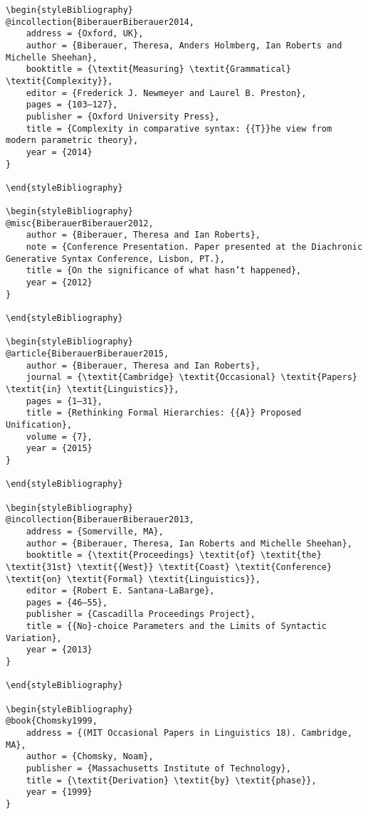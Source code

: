 \documentclass[output=paper,modfonts,nonflat]{langsci/langscibook}
\begin{document}
\begin{verbatim}
\begin{styleBibliography}
@incollection{BiberauerBiberauer2014,
	address = {Oxford, UK},
	author = {Biberauer, Theresa, Anders Holmberg, Ian Roberts and Michelle Sheehan},
	booktitle = {\textit{Measuring} \textit{Grammatical} \textit{Complexity}},
	editor = {Frederick J. Newmeyer and Laurel B. Preston},
	pages = {103–127},
	publisher = {Oxford University Press},
	title = {Complexity in comparative syntax: {{T}}he view from modern parametric theory},
	year = {2014}
}

\end{styleBibliography}

\begin{styleBibliography}
@misc{BiberauerBiberauer2012,
	author = {Biberauer, Theresa and Ian Roberts},
	note = {Conference Presentation. Paper presented at the Diachronic Generative Syntax Conference, Lisbon, PT.},
	title = {On the significance of what hasn’t happened},
	year = {2012}
}

\end{styleBibliography}

\begin{styleBibliography}
@article{BiberauerBiberauer2015,
	author = {Biberauer, Theresa and Ian Roberts},
	journal = {\textit{Cambridge} \textit{Occasional} \textit{Papers} \textit{in} \textit{Linguistics}},
	pages = {1–31},
	title = {Rethinking Formal Hierarchies: {{A}} Proposed Unification},
	volume = {7},
	year = {2015}
}

\end{styleBibliography}

\begin{styleBibliography}
@incollection{BiberauerBiberauer2013,
	address = {Somerville, MA},
	author = {Biberauer, Theresa, Ian Roberts and Michelle Sheehan},
	booktitle = {\textit{Proceedings} \textit{of} \textit{the} \textit{31st} \textit{{West}} \textit{Coast} \textit{Conference} \textit{on} \textit{Formal} \textit{Linguistics}},
	editor = {Robert E. Santana-LaBarge},
	pages = {46–55},
	publisher = {Cascadilla Proceedings Project},
	title = {{No}-choice Parameters and the Limits of Syntactic Variation},
	year = {2013}
}

\end{styleBibliography}

\begin{styleBibliography}
@book{Chomsky1999,
	address = {(MIT Occasional Papers in Linguistics 18). Cambridge, MA},
	author = {Chomsky, Noam},
	publisher = {Massachusetts Institute of Technology},
	title = {\textit{Derivation} \textit{by} \textit{phase}},
	year = {1999}
}


\end{verbatim}
\end{document}
